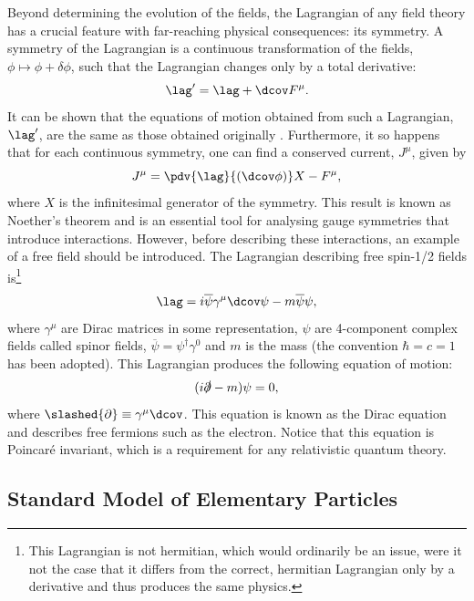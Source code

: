 Beyond determining the evolution of the fields, the Lagrangian of any field theory has a crucial feature with far-reaching physical consequences: its symmetry. A symmetry of the Lagrangian is a continuous transformation of the fields, $\phi \mapsto \phi + \delta \phi$, such that the Lagrangian changes only by a total derivative: $$\lag' = \lag + \dcov F^{\mu}.$$ It can be shown that the equations of motion obtained from such a Lagrangian, $\lag'$, are the same as those obtained originally \cite{peskin_introduction_1995}. Furthermore, it so happens that for each continuous symmetry, one can find a conserved current, $J^\mu$, given by
\begin{equation}
    J^\mu = \pdv{\lag}{(\dcov \phi)}X - F^\mu,
\end{equation}
where $X$ is the infinitesimal generator of the symmetry. This result is known as Noether's theorem and is an essential tool for analysing gauge symmetries that introduce interactions. However, before describing these interactions, an example of a free field should be introduced. The Lagrangian describing free spin-1/2 fields is\footnote{This Lagrangian is not hermitian, which would ordinarily be an issue, were it not the case that it differs from the correct, hermitian Lagrangian only by a derivative and thus produces the same physics.}
\begin{equation}\label{eq:dirac_lag}
    \lag = i\overline{\psi} \gamma^\mu \dcov \psi - m\overline{\psi}\psi,
\end{equation}
where $\gamma^\mu$ are Dirac matrices in some representation, $\psi$ are 4-component complex fields called spinor fields, $\overline{\psi} = \psi^\dagger \gamma^0$ and $m$ is the mass (the convention $\hbar = c = 1$ has been adopted). This Lagrangian produces the following equation of motion:
\begin{equation}\label{eq:Dirac_nu}
    (i\slashed{\partial}-m)\psi = 0,
\end{equation}
where $\slashed{\partial} \equiv \gamma^\mu \dcov$. This equation is known as the Dirac equation and describes free fermions such as the electron. Notice that this equation is Poincaré invariant, which is a requirement for any relativistic quantum theory.     
    
\subsection{Standard Model of Elementary Particles}
    

